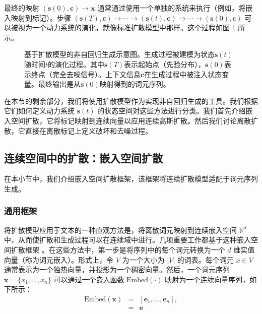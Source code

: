 最终的映射 $(\mathbf{s}(0), \mathbf{c}) \to \mathbf{x}$ 通常通过使用一个单独的系统来执行（例如，将嵌入映射到标记）。步骤 $(\mathbf{s}(T), \mathbf{c}) \to \cdots \to (\mathbf{s}(t), \mathbf{c}) \to \cdots \to (\mathbf{s}(0), \mathbf{c})$ 可以被视为一个动力系统的演化，就像标准扩散模型中那样。这个过程如图 \ref{fig:diffiusion-modeling-as-nar-generation} 所示。

\begin{figure}[!t]
\centering
{}
\caption{基于扩散模型的非自回归生成示意图。生成过程被建模为状态$\mathbf{s}(t)$随时间$t$的演化过程。其中$\mathbf{s}(T)$表示起始点（先验分布），$\mathbf{s}(0)$表示终点（完全去噪信号）。上下文信息$\mathbf{c}$在生成过程中被注入状态变量。最终输出是从$\mathbf{s}(0)$映射得到的词元序列。}
\label{fig:diffiusion-modeling-as-nar-generation}
\end{figure}

在本节的剩余部分，我们将使用扩散模型作为实现非自回归生成的工具。我们根据它们如何定义动力系统 $\mathbf{s}(t)$ 的状态空间对这些方法进行分类。我们首先介绍嵌入空间扩散，它将标记映射到连续向量以应用连续高斯扩散。然后我们讨论离散扩散，它直接在离散标记上定义破坏和去噪过程。
\subsection{连续空间中的扩散：嵌入空间扩散}

在本小节中，我们介绍嵌入空间扩散框架，该框架将连续扩散模型适配于词元序列生成。

\subsubsection{通用框架}

将扩散模型应用于文本的一种直观方法是，将离散词元映射到连续嵌入空间 $\mathbb{R}^d$ 中，从而使扩散和生成过程可以在连续域中进行。几项重要工作都基于这种嵌入空间扩散框架 \citep{li-etal:2022diffusion,strudel-etal:2022self,gong-etal:2023diffuseq}。在这些方法中，第一步是将序列中的每个词元转换为一个 $d$ 维实值向量（称为词元嵌入）。形式上，令 $V$ 为一个大小为 $|V|$ 的词表。每个词元 $x \in V$ 通常表示为一个独热向量，并投影为一个稠密向量。然后，一个词元序列 $\mathbf{x} = \{x_1, \dots, x_n\}$ 可以通过一个嵌入函数 $\mathrm{Embed}(\cdot)$ 映射为一个连续向量序列，如下所示：
\begin{eqnarray}
\mathrm{Embed}(\mathbf{x}) & = & [\mathbf{e}_1,\dots,\mathbf{e}_n], \nonumber \\
& = & \mathbf{e}
\end{eqnarray}

